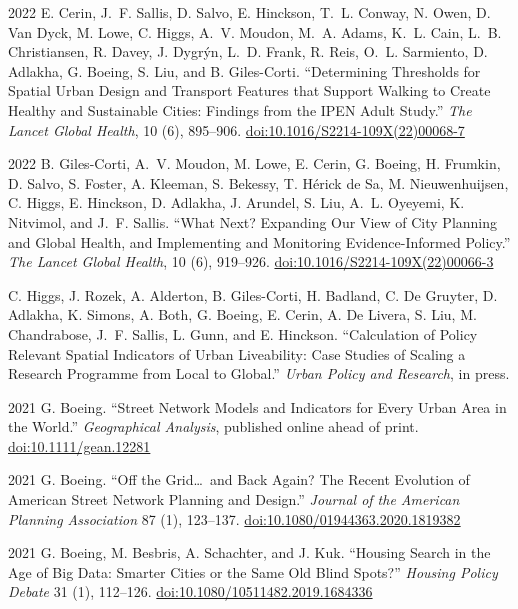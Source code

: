 \documentclass[12pt,letterpaper]{report}
\begin{document}
\begin{tablist}
        \item[2022] \tab{}E. Cerin, J.~F. Sallis, D. Salvo, E. Hinckson, T.~L. Conway, N. Owen, D. Van Dyck, M. Lowe, C. Higgs, A.~V. Moudon, M.~A. Adams, K.~L. Cain, L.~B. Christiansen, R. Davey, J. Dygrýn, L.~D. Frank, R. Reis, O.~L. Sarmiento, D. Adlakha, G. Boeing, S. Liu, and B. Giles-Corti. \enquote{Determining Thresholds for Spatial Urban Design and Transport Features that Support Walking to Create Healthy and Sustainable Cities: Findings from the IPEN Adult Study.}  \textit{The Lancet Global Health}, 10 (6), 895--906. \href{https://doi.org/10.1016/S2214-109X(22)00068-7}{doi:10.1016/S2214-109X(22)00068-7}

        \item[2022] \tab{}B. Giles-Corti, A.~V. Moudon, M. Lowe, E. Cerin, G. Boeing, H. Frumkin, D. Salvo, S. Foster, A. Kleeman, S. Bekessy, T. Hérick de Sa, M. Nieuwenhuijsen, C. Higgs, E. Hinckson, D. Adlakha, J. Arundel, S. Liu, A.~L. Oyeyemi, K. Nitvimol, and J.~F. Sallis. \enquote{What Next? Expanding Our View of City Planning and Global Health, and Implementing and Monitoring Evidence-Informed Policy.}  \textit{The Lancet Global Health}, 10 (6), 919--926. \href{https://doi.org/10.1016/S2214-109X(22)00066-3}{doi:10.1016/S2214-109X(22)00066-3} 
        
        \item[\the\year] \tab{}C. Higgs, J. Rozek, A. Alderton, B. Giles-Corti, H. Badland, C. De Gruyter, D. Adlakha, K. Simons, A. Both, G. Boeing, E. Cerin, A. De Livera, S. Liu, M. Chandrabose, J.~F. Sallis, L. Gunn, and E. Hinckson. \enquote{Calculation of Policy Relevant Spatial Indicators of Urban Liveability: Case Studies of Scaling a Research Programme from Local to Global.} \textit{Urban Policy and Research}, in press.

        \item[2021] \tab{}G. Boeing. \enquote{Street Network Models and Indicators for Every Urban Area in the World.} \textit{Geographical Analysis}, published online ahead of print. \href{https://doi.org/10.1111/gean.12281}{doi:10.1111/gean.12281}

        \item[2021] \tab{}G. Boeing. \enquote{Off the Grid\ldots\ and Back Again? The Recent Evolution of American Street Network Planning and Design.} \textit{Journal of the American Planning Association} 87 (1), 123--137. \href{https://doi.org/10.1080/01944363.2020.1819382}{doi:10.1080/01944363.2020.1819382}

        \item[2021] \tab{}G. Boeing, M. Besbris, A. Schachter, and J. Kuk. \enquote{Housing Search in the Age of Big Data: Smarter Cities or the Same Old Blind Spots?} \textit{Housing Policy Debate} 31 (1), 112--126. \href{https://doi.org/10.1080/10511482.2019.1684336}{doi:10.1080/10511482.2019.1684336}


\end{tablist}
\end{document}
